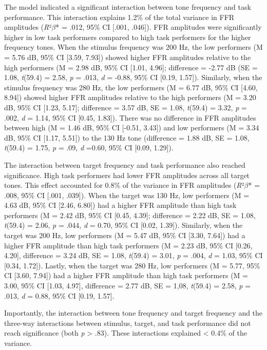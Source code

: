 The model indicated a significant interaction between tone frequency and task performance. This interaction explains 1.2\% of the total variance in FFR amplitudes (\textit{R}²$\beta$* = .012, 95\% CI [.001, .046]). FFR amplitudes were significantly higher in low task performers compared to high task performers for the higher frequency tones. When the stimulus frequency was 200 Hz, the low performers (M = 5.76 dB, 95\% CI [3.59, 7.93]) showed higher FFR amplitudes relative to the high performers (M = 2.98 dB, 95\% CI [1.01, 4.96]; difference = -2.77 dB (SE = 1.08, \textit{t}(59.4) = 2.58, \textit{p} = .013, \textit{d} = -0.88, 95\% CI [0.19, 1.57]). Similarly, when the stimulus frequency was 280 Hz, the low performers (M = 6.77 dB, 95\% CI [4.60, 8.94]) showed higher FFR amplitudes relative to the high performers (M = 3.20 dB, 95\% CI [1.23, 5.17]; difference = 3.57 dB, SE = 1.08, \textit{t}(59.4) = 3.32, \textit{p} = .002, \textit{d} = 1.14, 95\% CI [0.45, 1.83]). There was no difference in FFR amplitudes between high (M = 1.46 dB, 95\% CI [-0.51, 3.43]) and low performers (M = 3.34 dB, 95\% CI [1.17, 5.51]) to the 130 Hz tone (difference = 1.88 dB, SE = 1.08, \textit{t}(59.4) = 1.75, \textit{p} = .09, \textit{d} =0.60, 95\% CI [0.09, 1.29]).

The interaction between target frequency and task performance also reached significance. High task performers had lower FFR amplitudes across all target tones. This effect accounted for 0.8\% of the variance in FFR amplitudes (\textit{R}²$\beta$* = .008, 95\% CI [.001, .039]). When the target was 130 Hz, low performers (M = 4.63 dB, 95\% CI [2.46, 6.80]) had a higher FFR amplitude than high task performers (M = 2.42 dB, 95\% CI [0.45, 4.39]; difference = 2.22 dB, SE = 1.08, \textit{t}(59.4) = 2.06, \textit{p} = .044, \textit{d} = 0.70, 95\% CI [0.02, 1.39]). Similarly, when the target was 200 Hz, low performers (M = 5.47 dB, 95\% CI [3.30, 7.64]) had a higher FFR amplitude than high task performers (M = 2.23 dB, 95\% CI [0.26, 4.20], difference = 3.24 dB, SE = 1.08, \textit{t}(59.4) = 3.01, \textit{p} = .004, \textit{d} = 1.03, 95\% CI [0.34, 1.72]). Lastly, when the target was 280 Hz, low performers (M = 5.77, 95\% CI [3.60, 7.94]) had a higher FFR amplitude than high task performers (M = 3.00, 95\% CI [1.03, 4.97], difference = 2.77 dB, SE = 1,08, \textit{t}(59.4) = 2.58, \textit{p} = .013, \textit{d} = 0.88, 95\% CI [0.19, 1.57].

Importantly, the interaction between tone frequency and target frequency and the three-way interactions between stimulus, target, and task performance did not reach significance (both \textit{p} > .83). These interactions explained < 0.4\% of the variance. 



